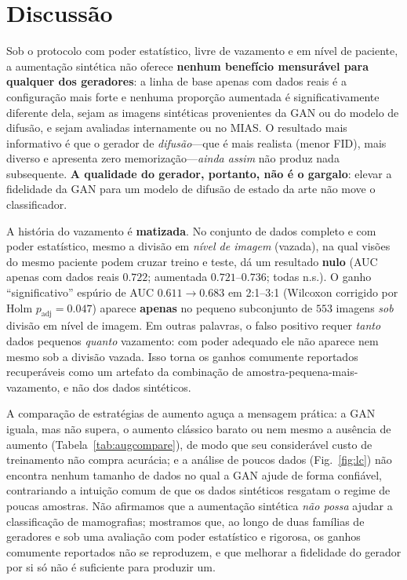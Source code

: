 \documentclass[runningheads]{llncs}
\begin{document}
\section{Discussão}
Sob o protocolo com poder estatístico, livre de vazamento e em nível de paciente,
a aumentação sintética não oferece \textbf{nenhum benefício mensurável para
qualquer dos geradores}: a linha de base apenas com dados reais é a configuração
mais forte e nenhuma proporção aumentada é significativamente diferente dela,
sejam as imagens sintéticas provenientes da GAN ou do modelo de difusão, e sejam
avaliadas internamente ou no MIAS. O resultado mais informativo é que o gerador de
\emph{difusão}---que é mais realista (menor FID), mais diverso e apresenta zero
memorização---\emph{ainda assim} não produz nada subsequente. \textbf{A qualidade
do gerador, portanto, não é o gargalo}: elevar a fidelidade da GAN para um modelo
de difusão de estado da arte não move o classificador.

A história do vazamento é \textbf{matizada}. No conjunto de dados completo e com
poder estatístico, mesmo a divisão em \emph{nível de imagem} (vazada), na qual
visões do mesmo paciente podem cruzar treino e teste, dá um resultado
\textbf{nulo} (AUC apenas com dados reais $0.722$; aumentada $0.721$--$0.736$;
todas n.s.). O ganho ``significativo'' espúrio de AUC $0.611\!\to\!0.683$ em
2:1--3:1 (Wilcoxon corrigido por Holm $p_\text{adj}{=}0.047$) aparece
\textbf{apenas} no pequeno subconjunto de $553$ imagens \emph{sob} divisão em
nível de imagem. Em outras palavras, o falso positivo requer \emph{tanto} dados
pequenos \emph{quanto} vazamento: com poder adequado ele não aparece nem mesmo sob
a divisão vazada. Isso torna os ganhos comumente reportados recuperáveis como um
artefato da combinação de amostra-pequena-mais-vazamento, e não dos dados
sintéticos.

A comparação de estratégias de aumento aguça a mensagem prática: a GAN iguala,
mas não supera, o aumento clássico barato ou nem mesmo a ausência de aumento
(Tabela~\ref{tab:augcompare}), de modo que seu considerável custo de treinamento
não compra acurácia; e a análise de poucos dados (Fig.~\ref{fig:lc}) não encontra
nenhum tamanho de dados no qual a GAN ajude de forma confiável, contrariando a
intuição comum de que os dados sintéticos resgatam o regime de poucas amostras.
Não afirmamos que a aumentação sintética \emph{não possa} ajudar a classificação
de mamografias; mostramos que, ao longo de duas famílias de geradores e sob uma
avaliação com poder estatístico e rigorosa, os ganhos comumente reportados não se
reproduzem, e que melhorar a fidelidade do gerador por si só não é suficiente para
produzir um.
\end{document}
